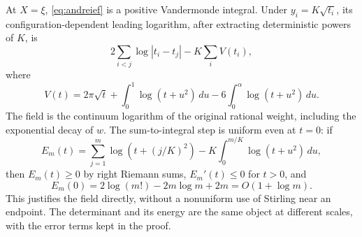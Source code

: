 \documentclass[11pt]{article}
\theoremstyle{definition}
\theoremstyle{remark}\newtheorem*{remark}{Remark}
\newcommand{\dd}{\,d}
\begin{document}
At $X=\xi$, \eqref{eq:andreief} is a positive Vandermonde integral. Under
$y_i=K\sqrt{t_i}$, its configuration-dependent leading logarithm, after
extracting deterministic powers of $K$, is
\begin{equation}\label{eq:discreteenergy}
 2\sum_{i<j}\log|t_i-t_j|-K\sum_iV(t_i),
\end{equation}
where
\[
 V(t)=2\pi\sqrt t+\int_0^1\log(t+u^2)\dd u
                   -6\int_0^\alpha\log(t+u^2)\dd u.
\]
The field is the continuum logarithm of the original rational weight, including
the exponential decay of $w$. The sum-to-integral step is uniform even at $t=0$:
if
\[
 E_m(t)=\sum_{j=1}^m\log(t+(j/K)^2)
       -K\int_0^{m/K}\log(t+u^2)\dd u,
\]
then $E_m(t)\ge0$ by right Riemann sums, $E_m'(t)\le0$ for $t>0$, and
\[
 E_m(0)=2\log(m!)-2m\log m+2m=O(1+\log m).
\]
This justifies the field directly, without a nonuniform use of Stirling near an
endpoint. The determinant and its energy are the same object at different
scales, with the error terms kept in the proof.
\end{document}
